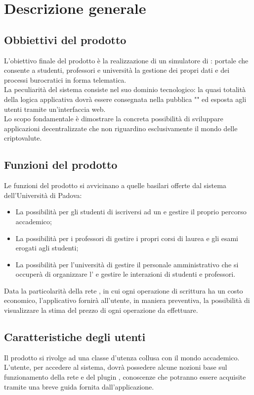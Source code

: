 \documentclass[AnalisiDeiRequisiti.tex]{subfiles}
\begin{document}
\chapter{Descrizione generale}
\section{Obbiettivi del prodotto}
L'obiettivo finale del prodotto è la realizzazione di un simulatore di : portale che consente a studenti, professori e università la gestione dei propri dati e dei processi burocratici in forma telematica. \\
La peculiarità del sistema consiste nel suo dominio tecnologico: la quasi totalità della logica applicativa dovrà essere consegnata nella  pubblica "" ed esposta agli utenti tramite un'interfaccia web. \\
Lo scopo fondamentale è dimostrare la concreta possibilità di sviluppare applicazioni decentralizzate che non riguardino esclusivamente il mondo delle criptovalute.

\section{Funzioni del prodotto}
Le funzioni del prodotto si avvicinano a quelle basilari offerte dal sistema  dell'Università di Padova:
\begin{itemize}
	\item La possibilità per gli studenti di iscriversi ad un  e gestire il proprio percorso accademico;
	\item La possibilità per i professori di gestire i propri corsi di laurea e gli esami erogati agli studenti;
	\item La possibilità per l'università di gestire il personale amministrativo che si occuperà di organizzare l' e gestire le interazioni di studenti e professori.
\end{itemize}
Data la particolarità della rete , in cui ogni operazione di scrittura ha un costo economico, l'applicativo fornirà all'utente, in maniera preventiva, la possibilità di visualizzare la stima del prezzo di ogni operazione da effettuare.


\section{Caratteristiche degli utenti}
Il prodotto si rivolge ad una classe d'utenza collusa con il mondo accademico.\\
L'utente, per accedere al sistema, dovrà possedere alcune nozioni base sul funzionamento della rete  e del plugin , conoscenze che potranno essere acquisite tramite una breve guida fornita dall'applicazione.
\end{document}
